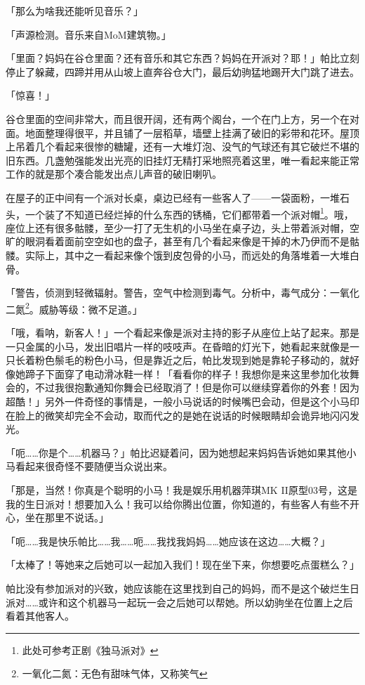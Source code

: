 「那么为啥我还能听见音乐？」

「{\mt 声源检测。音乐来自MoM建筑物。}」

「里面？妈妈在谷仓里面？还有音乐和其它东西？妈妈在开派对？耶！」帕比立刻停止了躲藏，四蹄并用从山坡上直奔谷仓大门，最后幼驹猛地踢开大门跳了进去。

「惊喜！」

谷仓里面的空间非常大，而且很开阔，还有两个阁台，一个在门上方，另一个在对面。地面整理得很平，并且铺了一层稻草，墙壁上挂满了破旧的彩带和花环。屋顶上吊着几个看起来很惨的糖罐，还有一大堆灯泡、没气的气球还有其它破烂不堪的旧东西。几盏勉强能发出光亮的旧挂灯无精打采地照亮着这里，唯一看起来能正常工作的就是那个凑合能发出点儿声音的破旧喇叭。

在屋子的正中间有一个派对长桌，桌边已经有一些客人了——一袋面粉，一堆石头，一个装了不知道已经烂掉的什么东西的锈桶，它们都带着一个派对帽\footnote{此处可参考正剧《独马派对》}。哦，座位上还有很多骷髅，至少一打了无生机的小马坐在桌子边，头上带着派对帽，空旷的眼洞看着面前空空如也的盘子，甚至有几个看起来像是干掉的木乃伊而不是骷髅。实际上，其中之一看起来像个饿到皮包骨的小马，而远处的角落堆着一大堆白骨。

「{\mt 警告，侦测到轻微辐射。警告，空气中检测到毒气。分析中，毒气成分：一氧化二氮\footnote{一氧化二氮：无色有甜味气体，又称笑气}。威胁等级：微不足道。}」

「哦，看呐，新客人！」一个看起来像是派对主持的影子从座位上站了起来。那是一只金属的小马，发出旧唱片一样的吱吱声。在昏暗的灯光下，她看起来就像是一只长着粉色鬃毛的粉色小马，但是靠近之后，帕比发现到她是靠轮子移动的，就好像她蹄子下面穿了电动滑冰鞋一样！「看看你的样子！我想你是来这里参加化妆舞会的，不过我很抱歉通知你舞会已经取消了！但是你可以继续穿着你的外套！因为超酷！」另外一件奇怪的事情是，一般小马说话的时候嘴巴会动，但是这个小马印在脸上的微笑却完全不会动，取而代之的是她在说话的时候眼睛却会诡异地闪闪发光。

「呃……你是个……机器马？」帕比迟疑着问，因为她想起来妈妈告诉她如果其他小马看起来很奇怪不要随便当众说出来。

「那是，当然！你真是个聪明的小马！我是娱乐用机器萍琪MK
II原型03号，这是我的生日派对！想要加入么！我可以给你腾出位置，你知道的，有些客人有些不开心，坐在那里不说话。」

「呃……我是快乐帕比……我……呃……我找我妈妈……她应该在这边……大概？」

「太棒了！等她来之后她可以一起加入我们！现在坐下来，你想要吃点蛋糕么？」

帕比没有参加派对的兴致，她应该能在这里找到自己的妈妈，而不是这个破烂生日派对……或许和这个机器马一起玩一会之后她可以帮她。所以幼驹坐在位置上之后看着其他客人。

